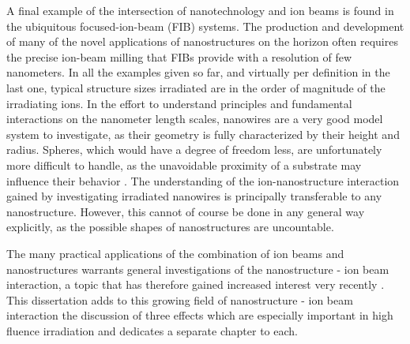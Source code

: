 A final example of the intersection of nanotechnology and ion beams is found in the ubiquitous focused-ion-beam (FIB) systems. The production and development of many of the novel applications of nanostructures on the horizon often requires the precise ion-beam milling that FIBs provide with a resolution of few nanometers. In all the examples given so far, and virtually per definition in the last one, typical structure sizes irradiated are in the order of magnitude of the irradiating ions. In the effort to understand principles and fundamental interactions on the nanometer length scales, nanowires are a very good model system to investigate, as their geometry is fully characterized by their height and radius. Spheres, which would have a degree of freedom less, are unfortunately more difficult to handle, as the unavoidable proximity of a substrate may influence their behavior \cite{moller_tri3dyn_2014,johannes_ion_2015}. The understanding of the ion-nanostructure interaction gained by investigating irradiated nanowires is principally transferable to any nanostructure. However, this cannot of course be done in any general way explicitly, as the possible shapes of nanostructures are uncountable.

The many practical applications of the combination of ion beams and nanostructures warrants general investigations of the nanostructure - ion beam interaction, a topic that has therefore gained increased interest very recently \cite{borschel_ion-solid_2012,greaves_enhanced_2013,nietiadi_sputtering_2014,johannes_ion_2015,urbassek_sputter_2015}.  This dissertation adds to this growing field of nanostructure - ion beam interaction the discussion of three effects which are especially important in high fluence irradiation and dedicates a separate chapter to each. 
 
